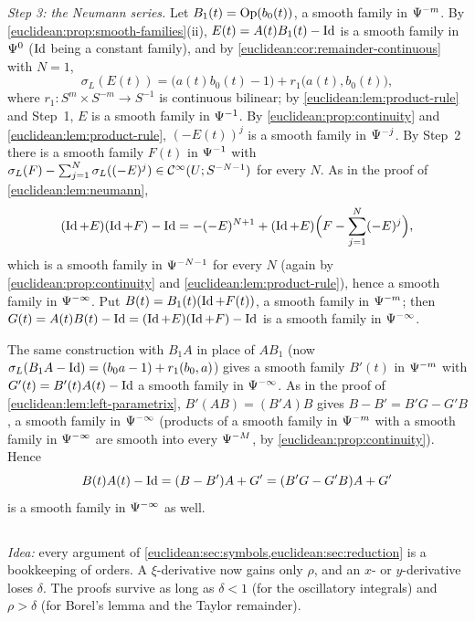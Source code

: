 \emph{Step 3: the Neumann series.} Let $B_1(t)=\operatorname{Op}(b_0(t))$, a smooth family in
$\Psi^{-m}$. By \cref{euclidean:prop:smooth-families}(ii), $E(t)=A(t)B_1(t)-\operatorname{Id}$ is a
smooth family in $\Psi^{0}$ ($\operatorname{Id}$ being a constant family), and by
\cref{euclidean:cor:remainder-continuous} with $N=1$,
\begin{equation*}
  \sigma_L(E(t))=\bigl(a(t)b_0(t)-1\bigr)+r_1\bigl(a(t),b_0(t)\bigr),
\end{equation*}
where $r_1:S^m\times S^{-m}\to S^{-1}$ is continuous bilinear; by
\cref{euclidean:lem:product-rule} and Step~1, $E$ is a smooth family in $\Psi^{-1}$. By
\cref{euclidean:prop:continuity} and \cref{euclidean:lem:product-rule}, $(-E(t))^j$ is a
smooth family in $\Psi^{-j}$. By Step~2 there is a smooth family $F(t)$ in $\Psi^{-1}$
with $\sigma_L(F)-\sum_{j=1}^N\sigma_L((-E)^j)\in\mathcal{C}^\infty(U;S^{-N-1})$ for every $N$. As in the
proof of \cref{euclidean:lem:neumann},
\begin{equation*}
  (\operatorname{Id}+E)(\operatorname{Id}+F)-\operatorname{Id}=-(-E)^{N+1}+(\operatorname{Id}+E)\Bigl(F-\sum_{j=1}^N(-E)^j\Bigr),
\end{equation*}
which is a smooth family in $\Psi^{-N-1}$ for every $N$ (again by
\cref{euclidean:prop:continuity} and \cref{euclidean:lem:product-rule}), hence a smooth
family in $\Psi^{-\infty}$. Put $B(t)=B_1(t)(\operatorname{Id}+F(t))$, a smooth family in $\Psi^{-m}$;
then $G(t)=A(t)B(t)-\operatorname{Id}=(\operatorname{Id}+E)(\operatorname{Id}+F)-\operatorname{Id}$ is a smooth family in $\Psi^{-\infty}$.

The same construction with $B_1A$ in place of $AB_1$ (now
$\sigma_L(B_1A-\operatorname{Id})=(b_0a-1)+r_1(b_0,a)$) gives a smooth family $B'(t)$ in $\Psi^{-m}$
with $G'(t)=B'(t)A(t)-\operatorname{Id}$ a smooth family in $\Psi^{-\infty}$. As in the proof of
\cref{euclidean:lem:left-parametrix}, $B'(AB)=(B'A)B$ gives $B-B'=B'G-G'B$, a smooth family
in $\Psi^{-\infty}$ (products of a smooth family in $\Psi^{-m}$ with a smooth family in
$\Psi^{-\infty}$ are smooth into every $\Psi^{-M}$, by \cref{euclidean:prop:continuity}).
Hence
\begin{equation*}
  B(t)A(t)-\operatorname{Id}=(B-B')A+G'=(B'G-G'B)A+G'
\end{equation*}
is a smooth family in $\Psi^{-\infty}$ as well.

\subsection*{}

\emph{Idea:} every argument of \cref{euclidean:sec:symbols,euclidean:sec:reduction} is a
bookkeeping of orders. A $\xi$-derivative now gains only $\rho$, and an $x$- or
$y$-derivative loses $\delta$. The proofs survive as long as $\delta<1$ (for the
oscillatory integrals) and $\rho>\delta$ (for Borel's lemma and the Taylor remainder).


